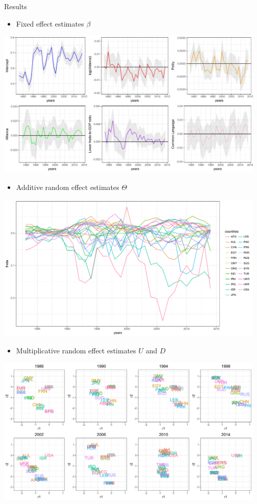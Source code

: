 \documentclass[serif,mathserif,final,table]{beamer}
\begin{document}
\begin{frame}{}
\begin{columns}[t]
\begin{column}{0.235\linewidth}
\begin{block}{Results}
		\begin{itemize}
            \item Fixed effect estimates $\beta$	\end{itemize}
             \includegraphics[width=0.968\textwidth]{betas.pdf}		\begin{itemize}
            \item Additive random effect estimates $\Theta$	\end{itemize}
             \includegraphics[width=0.968\textwidth]{theta.pdf}		\begin{itemize}
            \item Multiplicative random effect estimates $U$ and $D$
            		\end{itemize}
               \includegraphics[width=0.968\textwidth]{UDU.pdf}
        

\end{block}
\end{column}
\end{columns}
\end{frame}
\end{document}

